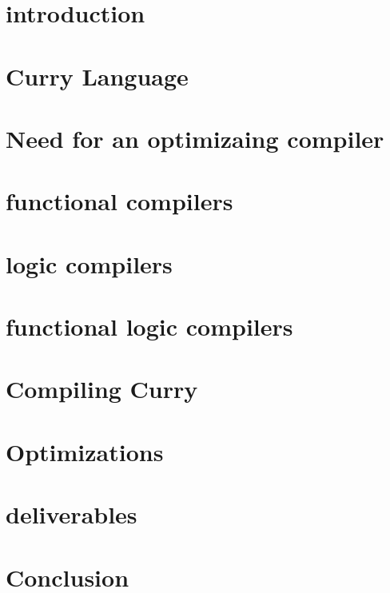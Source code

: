 \documentclass{article}
\begin{document}
\begin{abstract}
    
\end{abstract}

\section{introduction}


\section{Curry Language}


\section{Need for an optimizaing compiler}


\section{functional compilers}


\section{logic compilers}


\section{functional logic compilers}


\section{Compiling Curry}


\section{Optimizations}


\section{deliverables}


\section{Conclusion}

\end{document}

